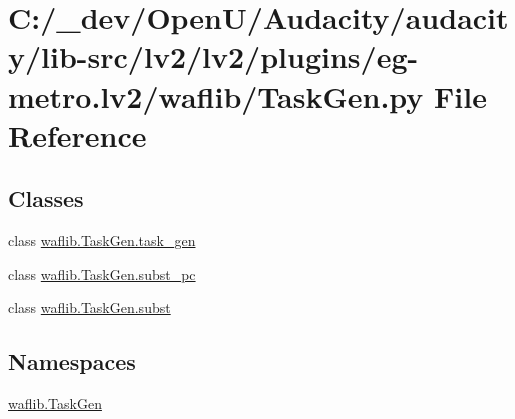\hypertarget{lv2_2plugins_2eg-metro_8lv2_2waflib_2_task_gen_8py}{}\section{C\+:/\+\_\+dev/\+Open\+U/\+Audacity/audacity/lib-\/src/lv2/lv2/plugins/eg-\/metro.lv2/waflib/\+Task\+Gen.py File Reference}
\label{lv2_2plugins_2eg-metro_8lv2_2waflib_2_task_gen_8py}
\subsection*{Classes}
\begin{DoxyCompactItemize}
\item 
class \hyperlink{classwaflib_1_1_task_gen_1_1task__gen}{waflib.\+Task\+Gen.\+task\+\_\+gen}
\item 
class \hyperlink{classwaflib_1_1_task_gen_1_1subst__pc}{waflib.\+Task\+Gen.\+subst\+\_\+pc}
\item 
class \hyperlink{classwaflib_1_1_task_gen_1_1subst}{waflib.\+Task\+Gen.\+subst}
\end{DoxyCompactItemize}
\subsection*{Namespaces}
\begin{DoxyCompactItemize}
\item 
 \hyperlink{namespacewaflib_1_1_task_gen}{waflib.\+Task\+Gen}
\end{DoxyCompactItemize}
